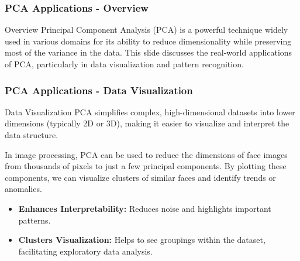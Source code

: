 \documentclass[aspectratio=169]{beamer}
\begin{document}
\begin{frame}[fragile]
    \frametitle{PCA Applications - Overview}
    \begin{block}{Overview}
        Principal Component Analysis (PCA) is a powerful technique widely used in various domains for its ability to reduce dimensionality while preserving most of the variance in the data. This slide discusses the real-world applications of PCA, particularly in data visualization and pattern recognition.
    \end{block}
\end{frame}

\begin{frame}[fragile]
    \frametitle{PCA Applications - Data Visualization}
    \begin{block}{Data Visualization}
        PCA simplifies complex, high-dimensional datasets into lower dimensions (typically 2D or 3D), making it easier to visualize and interpret the data structure.
    \end{block}

    \begin{example}
        In image processing, PCA can be used to reduce the dimensions of face images from thousands of pixels to just a few principal components. By plotting these components, we can visualize clusters of similar faces and identify trends or anomalies.
    \end{example}
    
    \begin{itemize}
        \item \textbf{Enhances Interpretability:} Reduces noise and highlights important patterns.
        \item \textbf{Clusters Visualization:} Helps to see groupings within the dataset, facilitating exploratory data analysis.
    \end{itemize}
\end{frame}
\end{document}
